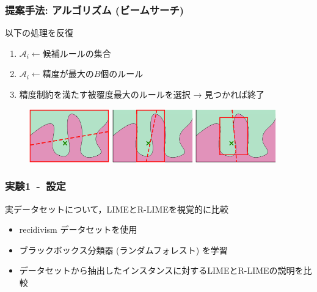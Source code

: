 \documentclass[aspectratio=169]{slide-ja}
\begin{document}
\begin{frame}
  \frametitle{提案手法: アルゴリズム (ビームサーチ)}

  \bigskip
  \bigskip
  以下の処理を反復
  \begin{enumerate}
    \item $\mathcal{A}_i\gets$候補ルールの集合
    \item $\mathcal{A}_i\gets$精度が最大の$B$個のルール
    \item 精度制約を満たす被覆度最大のルールを選択 → 見つかれば終了
  \end{enumerate}
  \vspace{-1em}
  \begin{figure}[t]
    \centering
    \includegraphics[width=0.31\textwidth]{visual-rlime1}
    \includegraphics[width=0.31\textwidth]{visual-rlime2}
    \includegraphics[width=0.31\textwidth]{visual-rlime3}
  \end{figure}
\end{frame}


\begin{frame}
  \frametitle{実験1~-~設定}
  実データセットについて，LIMEとR-LIMEを視覚的に比較
  \begin{itemize}
    \item recidivism データセットを使用
    \item ブラックボックス分類器 (ランダムフォレスト) を学習
    \item データセットから抽出したインスタンスに対するLIMEとR-LIMEの説明を比較
  \end{itemize}
\end{frame}
\end{document}
